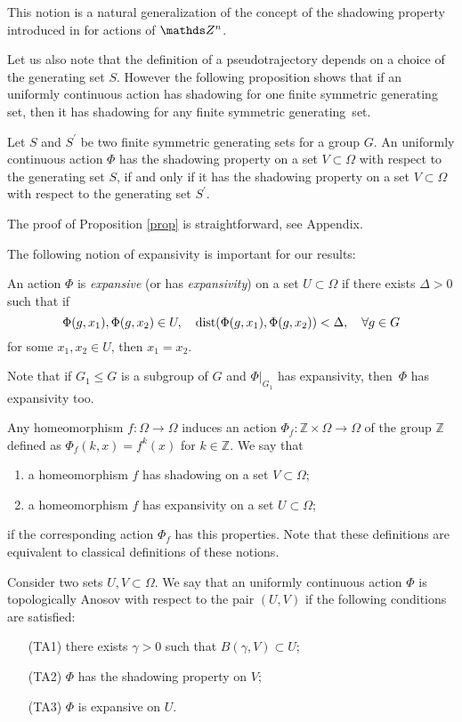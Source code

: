 This notion is a natural generalization of the concept of the shadowing property introduced in \cite{PilTikh} for actions of $\ZZ^n$.

Let us also note that the definition of a pseudotrajectory depends on a choice of the generating set $S$. However the following proposition shows that if an  uniformly continuous action has shadowing for one finite symmetric generating set, then it has shadowing for any finite symmetric generating~set.

\begin{prp}
\label{prop}
Let $S$ and $S^{\prime}$ be two finite symmetric generating sets for a group $G$.  An uniformly continuous action $\Phi$ has the shadowing property on a set $V \subset \Omega$ with respect to the generating set $S$, if and only if it has the shadowing property on a set $V \subset \Omega$ with respect to the generating set $S^{\prime}$.
\end{prp}

The proof of Proposition \ref{prop} is straightforward, see Appendix.

The following notion of expansivity is important for our results:
\begin{defin}
An action $\Phi$ is \textit{expansive} (or has \textit{expansivity}) on a set $U \subset \Omega$ if there exists $\Delta > 0$ such that if
$$
\Phi(g, x_1),\Phi(g, x_2) \in U, \quad \operatorname{dist}(\Phi(g, x_1), \Phi(g, x_2)) < \Delta, \quad \forall g \in G
$$
for some $x_1, x_2 \in U$, then
 $x_1 = x_2$.
\end{defin}
Note that if $G_1 \leq G$ is a subgroup of $G$ and $\Phi|_{G_1}$ has expansivity, then~$\Phi$ has expansivity too.

Any homeomorphism $f: \Omega \to \Omega$ induces an action $\Phi_f: \mathbb{Z} \times \Omega \to \Omega$ of the group $\mathbb{Z}$ defined as $\Phi_f(k, x) = f^k(x)$ for $k\in\mathbb{Z}$.
 We say that
\begin{enumerate}
\item a %
homeomorphism $f$ has shadowing on a set \hbox{$V \subset \Omega$};
\item a homeomorphism $f$ has expansivity on a set $U \subset \Omega$;
\end{enumerate}
if the corresponding action $\Phi_f$ has this properties. Note that these definitions are equivalent to classical definitions of these notions.

\begin{defin}
Consider two sets $U, V \subset \Omega$. We say that an uniformly continuous action $\Phi$ is topologically Anosov with respect to the pair $(U, V)$ if the following conditions are satisfied:
\begin{itemize}
\item[(TA1)] there exists $\gamma > 0$ such that $B(\gamma, V) \subset U$;
\item[(TA2)] $\Phi$ has the shadowing property on $V$;
\item[(TA3)] $\Phi$ is expansive on $U$.
\end{itemize}
\end{defin}

